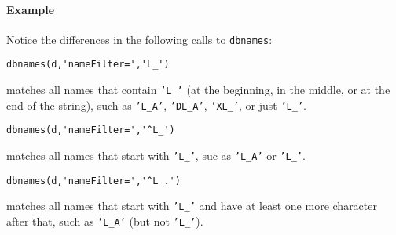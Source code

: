 \paragraph{Example}\label{example}

Notice the differences in the following calls to \texttt{dbnames}:

\begin{verbatim}
dbnames(d,'nameFilter=','L_')
\end{verbatim}

matches all names that contain \texttt{'L\_'} (at the beginning, in the
middle, or at the end of the string), such as \texttt{'L\_A'},
\texttt{'DL\_A'}, \texttt{'XL\_'}, or just \texttt{'L\_'}.

\begin{verbatim}
dbnames(d,'nameFilter=','^L_')
\end{verbatim}

matches all names that start with \texttt{'L\_'}, suc as \texttt{'L\_A'}
or \texttt{'L\_'}.

\begin{verbatim}
dbnames(d,'nameFilter=','^L_.')
\end{verbatim}

matches all names that start with \texttt{'L\_'} and have at least one
more character after that, such as \texttt{'L\_A'} (but not
\texttt{'L\_'}).


